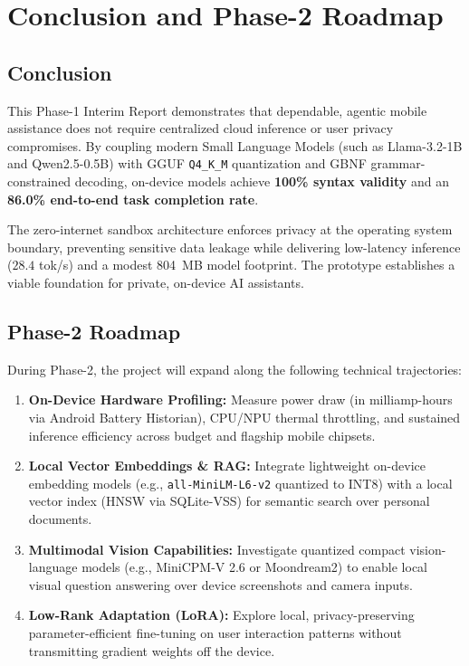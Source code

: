 \documentclass[12pt,a4paper,oneside]{report}
\begin{document}
\newpage
\chapter{Conclusion and Phase-2 Roadmap}

\section{Conclusion}
This Phase-1 Interim Report demonstrates that dependable, agentic mobile assistance does not require centralized cloud inference or user privacy compromises. By coupling modern Small Language Models (such as Llama-3.2-1B and Qwen2.5-0.5B) with GGUF \texttt{Q4\_K\_M} quantization and GBNF grammar-constrained decoding, on-device models achieve \textbf{100\% syntax validity} and an \textbf{86.0\% end-to-end task completion rate}.

The zero-internet sandbox architecture enforces privacy at the operating system boundary, preventing sensitive data leakage while delivering low-latency inference ($28.4$ tok/s) and a modest 804~MB model footprint. The prototype establishes a viable foundation for private, on-device AI assistants.

\section{Phase-2 Roadmap}
During Phase-2, the project will expand along the following technical trajectories:
\begin{enumerate}
    \item \textbf{On-Device Hardware Profiling:} Measure power draw (in milliamp-hours via Android Battery Historian), CPU/NPU thermal throttling, and sustained inference efficiency across budget and flagship mobile chipsets.
    \item \textbf{Local Vector Embeddings \& RAG:} Integrate lightweight on-device embedding models (e.g., \texttt{all-MiniLM-L6-v2} quantized to INT8) with a local vector index (HNSW via SQLite-VSS) for semantic search over personal documents.
    \item \textbf{Multimodal Vision Capabilities:} Investigate quantized compact vision-language models (e.g., MiniCPM-V 2.6 or Moondream2) to enable local visual question answering over device screenshots and camera inputs.
    \item \textbf{Low-Rank Adaptation (LoRA):} Explore local, privacy-preserving parameter-efficient fine-tuning on user interaction patterns without transmitting gradient weights off the device.
\end{enumerate}
\end{document}
